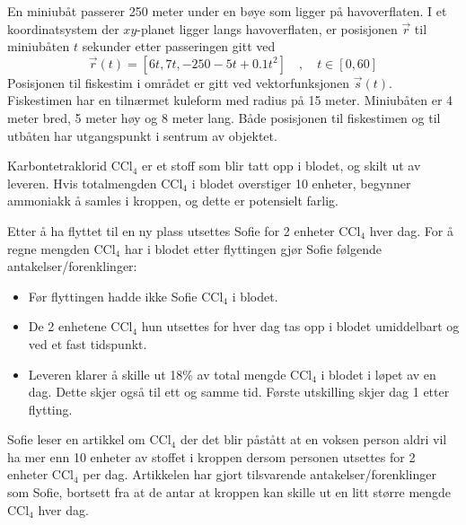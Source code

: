 En miniubåt passerer 250 meter under en bøye som ligger på havoverflaten.
I et koordinatsystem der $xy$-planet ligger langs havoverflaten, er posisjonen $\vec{r}$ til miniubåten $t$ sekunder etter passeringen gitt ved
\[ \vec{r}(t) = [6t, 7t, -250 - 5t + 0.1t^2]\quad, \quad t \in [0, 60] \]
Posisjonen til fiskestim i området er gitt ved vektorfunksjonen $\vec{s}(t)$. Fiskestimen har en tilnærmet kuleform med radius på 15 meter. Miniubåten er 4 meter bred,
5 meter høy og 8 meter lang. Både posisjonen til fiskestimen og til utbåten har utgangspunkt i sentrum av objektet.

\newpage
{}
Karbontetraklorid $\text{CCl}_4$ er et stoff som blir tatt opp i blodet, og skilt ut av leveren. Hvis totalmengden $\text{CCl}_4$ i blodet overstiger 10 enheter, begynner ammoniakk å
samles i kroppen, og dette er potensielt farlig. \os

Etter å ha flyttet til en ny plass utsettes Sofie for 2 enheter $\text{CCl}_4$ hver dag.  For å regne mengden $\text{CCl}_4$ har i blodet etter flyttingen gjør Sofie følgende antakelser/forenklinger:
\begin{itemize}
	\item Før flyttingen hadde ikke Sofie $\text{CCl}_4$ i blodet.
	\item De 2 enhetene $\text{CCl}_4$ hun utsettes for hver dag tas opp i blodet umiddelbart og ved et fast tidspunkt.
	\item Leveren klarer å skille ut 18\% av total mengde $\text{CCl}_4$ i blodet i løpet av en dag. Dette skjer også til ett og samme tid. Første utskilling skjer dag 1 etter flytting.
\end{itemize}

Sofie leser en artikkel om $\text{CCl}_4$ der det blir påstått at en voksen person aldri vil ha mer enn 10 enheter av stoffet i kroppen dersom personen utsettes for 2 enheter $\text{CCl}_4$ per dag. Artikkelen har gjort tilsvarende antakelser/forenklinger som Sofie, bortsett fra at de antar at kroppen kan skille ut en litt større mengde $\text{CCl}_4$ hver dag.

